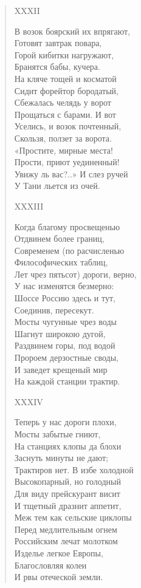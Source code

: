 \begin{verse}
XXXII

В возок боярский их впрягают,\\
Готовят завтрак повара,\\
Горой кибитки нагружают,\\
Бранятся бабы, кучера.\\
На кляче тощей и косматой\\
Сидит форейтор бородатый,\\
Сбежалась челядь у ворот\\
Прощаться с барами. И вот\\
Уселись, и возок почтенный,\\
Скользя, ползет за ворота.\\
«Простите, мирные места!\\
Прости, приют уединенный!\\
Увижу ль вас?..» И слез ручей\\
У Тани льется из очей.

XXXIII

Когда благому просвещенью\\
Отдвинем более границ,\\
Современем (по расчисленью\\
Философических таблиц,\\
Лет чрез пятьсот) дороги, верно,\\
У нас изменятся безмерно:\\
Шоссе Россию здесь и тут,\\
Соединив, пересекут.\\
Мосты чугунные чрез воды\\
Шагнут широкою дугой,\\
Раздвинем горы, под водой\\
Пророем дерзостные своды,\\
И заведет крещеный мир\\
На каждой станции трактир.

XXXIV

Теперь у нас дороги плохи,\\
Мосты забытые гниют,\\
На станциях клопы да блохи\\
Заснуть минуты не дают;\\
Трактиров нет. В избе холодной\\
Высокопарный, но голодный\\
Для виду прейскурант висит\\
И тщетный дразнит аппетит,\\
Меж тем как сельские циклопы\\
Перед медлительным огнем\\
Российским лечат молотком\\
Изделье легкое Европы,\\
Благословляя колеи\\
И рвы отеческой земли.


\end{verse}
